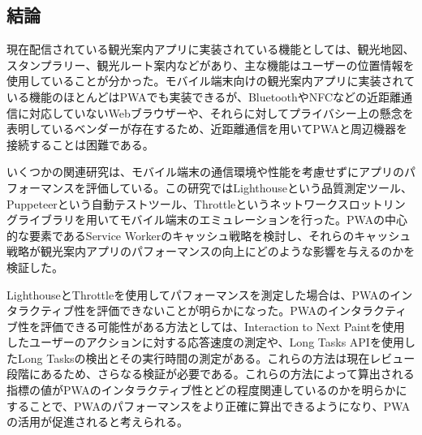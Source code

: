 \subsection{結論}
\label{subsection:結論}
現在配信されている観光案内アプリに実装されている機能としては、観光地図、スタンプラリー、観光ルート案内などがあり、主な機能はユーザーの位置情報を使用していることが分かった。モバイル端末向けの観光案内アプリに実装されている機能のほとんどはPWAでも実装できるが、BluetoothやNFCなどの近距離通信に対応していないWebブラウザーや、それらに対してプライバシー上の懸念を表明しているベンダーが存在するため、近距離通信を用いてPWAと周辺機器を接続することは困難である。

いくつかの関連研究は、モバイル端末の通信環境や性能を考慮せずにアプリのパフォーマンスを評価している。この研究ではLighthouseという品質測定ツール、Puppeteerという自動テストツール、Throttleというネットワークスロットリングライブラリを用いてモバイル端末のエミュレーションを行った。PWAの中心的な要素であるService Workerのキャッシュ戦略を検討し、それらのキャッシュ戦略が観光案内アプリのパフォーマンスの向上にどのような影響を与えるのかを検証した。

LighthouseとThrottleを使用してパフォーマンスを測定した場合は、PWAのインタラクティブ性を評価できないことが明らかになった。PWAのインタラクティブ性を評価できる可能性がある方法としては、Interaction to Next Paintを使用したユーザーのアクションに対する応答速度の測定や、Long Tasks APIを使用したLong Tasksの検出とその実行時間の測定がある。これらの方法は現在レビュー段階にあるため、さらなる検証が必要である。これらの方法によって算出される指標の値がPWAのインタラクティブ性とどの程度関連しているのかを明らかにすることで、PWAのパフォーマンスをより正確に算出できるようになり、PWAの活用が促進されると考えられる。